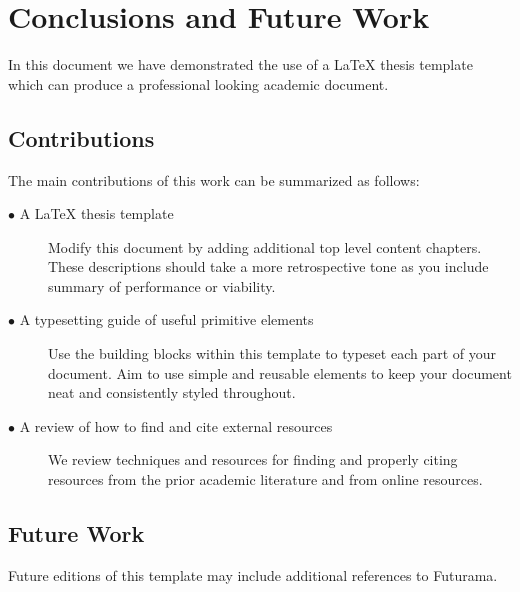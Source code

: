 \chapter{Conclusions and Future Work}
\label{chap:conclusion}

In this document we have demonstrated the use of a LaTeX thesis template which can produce a professional looking academic document. 

\section{Contributions} 
\label{sec:conclusion_contributions}

The main contributions of this work can be summarized as follows:
\begin{description}	

	\item[$\bullet$ A LaTeX thesis template]\hfill
	
	Modify this document by adding additional top level content chapters. These descriptions should take a more retrospective tone as you include summary of performance or viability. 
	
	
	\item[$\bullet$ A typesetting guide of useful primitive elements]\hfill
	
	Use the building blocks within this template to typeset each part of your document. Aim to use simple and reusable elements to keep your document neat and consistently styled throughout.
	
	\item[$\bullet$ A review of how to find and cite external resources]\hfill
		
	We review techniques and resources for finding and properly citing resources from the prior academic literature and from online resources. 
	
\end{description}

\section{Future Work}
\label{sec:conclusion_future_work}

Future editions of this template may include additional references to Futurama.